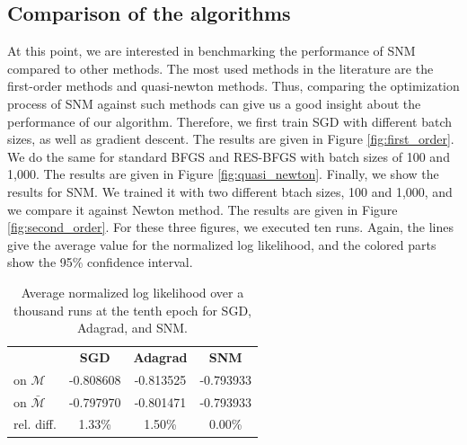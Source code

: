 \documentclass[conference]{IEEEtran}
\begin{document}
\subsection{Comparison of the algorithms}
\label{sec:comp_algo}

At this point, we are interested in benchmarking the performance of SNM compared to other methods. The most used methods in the literature are the first-order methods and quasi-newton methods. Thus, comparing the optimization process of SNM against such methods can give us a good insight about the performance of our algorithm. Therefore, we first train SGD with different batch sizes, as well as gradient descent. The results are given in Figure \ref{fig:first_order}. We do the same for standard BFGS and RES-BFGS with batch sizes of 100 and 1,000. The results are given in Figure \ref{fig:quasi_newton}. Finally, we show the results for SNM. We trained it with two different btach sizes, 100 and 1,000, and we compare it against Newton method. The results are given in Figure \ref{fig:second_order}. For these three figures, we executed ten runs. Again, the lines give the average value for the normalized log likelihood, and the colored parts show the 95\% confidence interval.

\begin{table}[b]
\vspace{-0.5cm}
\centering
\renewcommand\arraystretch{1.2}
\begin{tabular}{l|ccc}
\multicolumn{1}{l}{} & {\bf SGD} & {\bf Adagrad} & {\bf SNM} \\ \cline{2-4}
on $\mathcal{M}$ & -0.808608 & -0.813525 & -0.793933 \\
on $\bar{\mathcal{M}}$ & -0.797970 & -0.801471
 & -0.793933 \\ \hline
rel. diff. & 1.33\% & 1.50\% & 0.00\%
\end{tabular}
\caption{\label{tab:res_norm_unorm} Average normalized log likelihood over a thousand runs at the tenth epoch for SGD, Adagrad, and SNM.}
\end{table}
\end{document}
